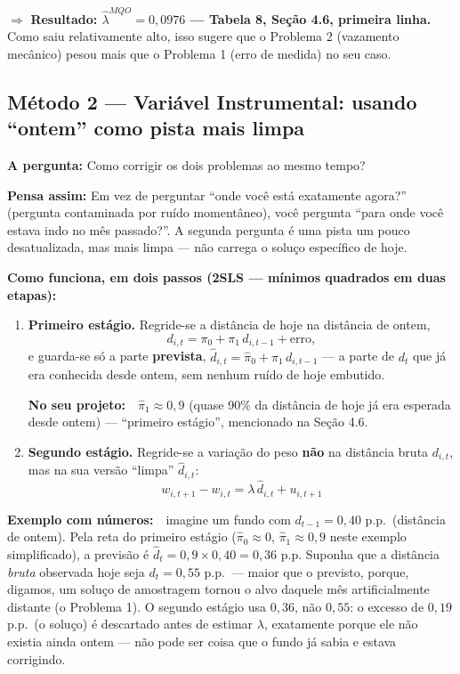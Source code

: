 \documentclass[11pt,a4paper]{article}
\newcommand{\pergunta}[1]{\par\vspace{4pt}\noindent\textbf{\color{azul}A pergunta:} #1\par\vspace{2pt}}
\newcommand{\analogia}[1]{\par\vspace{4pt}\noindent\textbf{\color{verde}Pensa assim:} #1\par\vspace{2pt}}
\newcommand{\exemplo}[0]{\par\vspace{4pt}\noindent\textbf{\color{vermelho}Exemplo com números:}\ }
\newcommand{\noprojeto}[0]{\par\vspace{4pt}\noindent\textbf{No seu projeto:}\ }
\begin{document}
$\Rightarrow$ \textbf{Resultado: $\widehat\lambda^{MQO}=0{,}0976$ --- Tabela 8, Seção 4.6, primeira linha.}
Como saiu relativamente alto, isso sugere que o Problema 2 (vazamento mecânico) pesou mais que
o Problema 1 (erro de medida) no seu caso.

\subsection{Método 2 --- Variável Instrumental: usando ``ontem'' como pista mais limpa}

\pergunta{Como corrigir os dois problemas ao mesmo tempo?}

\analogia{Em vez de perguntar ``onde você está exatamente agora?'' (pergunta contaminada por
ruído momentâneo), você pergunta ``para onde você estava indo no mês passado?''. A segunda
pergunta é uma pista um pouco desatualizada, mas mais limpa --- não carrega o soluço específico
de hoje.}

\textbf{Como funciona, em dois passos (2SLS --- mínimos quadrados em duas etapas):}
\begin{enumerate}[topsep=2pt,itemsep=2pt]
\item \textbf{Primeiro estágio.} Regride-se a distância de hoje na distância de ontem,
$$d_{i,t} = \pi_0 + \pi_1\, d_{i,t-1} + \text{erro},$$
e guarda-se só a parte \textbf{prevista}, $\widehat d_{i,t} = \widehat\pi_0 + \widehat\pi_1\,
d_{i,t-1}$ --- a parte de $d_t$ que já era conhecida desde ontem, sem nenhum ruído de hoje
embutido. \noprojeto\ $\widehat\pi_1\approx 0{,}9$ (quase 90\% da distância de hoje já era
esperada desde ontem) --- ``primeiro estágio'', mencionado na Seção 4.6.
\item \textbf{Segundo estágio.} Regride-se a variação do peso \textbf{não} na distância bruta
$d_{i,t}$, mas na sua versão ``limpa'' $\widehat d_{i,t}$:
$$w_{i,t+1}-w_{i,t} = \lambda\,\widehat d_{i,t} + u_{i,t+1}$$
\end{enumerate}

\exemplo\ imagine um fundo com $d_{t-1}=0{,}40$ p.p.\ (distância de ontem). Pela reta do primeiro
estágio ($\widehat\pi_0\approx0$, $\widehat\pi_1\approx0{,}9$ neste exemplo simplificado), a
previsão é $\widehat d_t = 0{,}9\times0{,}40 = 0{,}36$ p.p. Suponha que a distância \emph{bruta}
observada hoje seja $d_t = 0{,}55$ p.p.\ --- maior que o previsto, porque, digamos, um soluço de
amostragem tornou o alvo daquele mês artificialmente distante (o Problema 1). O segundo estágio
usa $0{,}36$, não $0{,}55$: o excesso de $0{,}19$ p.p.\ (o soluço) é descartado antes de estimar
$\lambda$, exatamente porque ele não existia ainda ontem --- não pode ser coisa que o fundo já
sabia e estava corrigindo.
\end{document}
